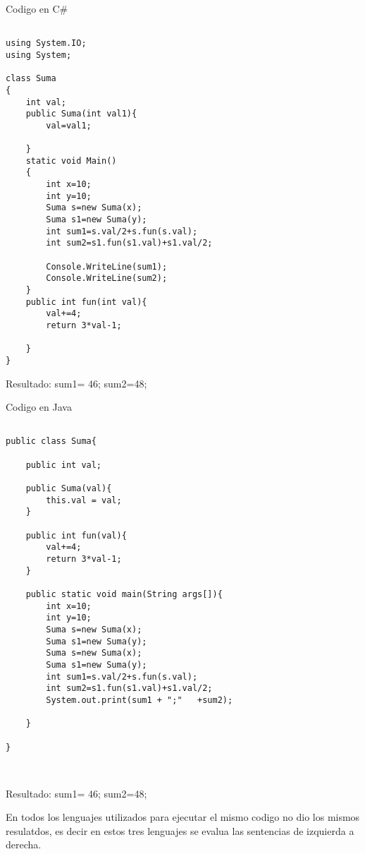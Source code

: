 \documentclass[11pt]{article}
\begin{document}
Codigo en C\#
\begin{lstlisting}[frame=single]  % Start your code-block

using System.IO;
using System;

class Suma
{
    int val;
    public Suma(int val1){
        val=val1;
        
    }
    static void Main()
    {
        int x=10;
        int y=10;
        Suma s=new Suma(x);
        Suma s1=new Suma(y);
        int sum1=s.val/2+s.fun(s.val);
        int sum2=s1.fun(s1.val)+s1.val/2;
        
        Console.WriteLine(sum1);
        Console.WriteLine(sum2);
    }
    public int fun(int val){
        val+=4;
        return 3*val-1;
        
    }
}

\end{lstlisting}
Resultado:
sum1= 46; sum2=48;
 


Codigo en Java
\begin{lstlisting}[frame=single]  % Start your code-block

public class Suma{

	public int val; 

	public Suma(val){
		this.val = val;
	}

	public int fun(val){
	 	val+=4;
        return 3*val-1;
	}
	
	public static void main(String args[]){
		int x=10;
		int y=10;
		Suma s=new Suma(x);
        Suma s1=new Suma(y);
        Suma s=new Suma(x);
        Suma s1=new Suma(y);
        int sum1=s.val/2+s.fun(s.val);
        int sum2=s1.fun(s1.val)+s1.val/2;        
        System.out.print(sum1 + ";"   +sum2);	
	
	}

}



\end{lstlisting}
Resultado:
sum1= 46; sum2=48;

En todos los lenguajes utilizados para ejecutar el mismo codigo no dio los mismos resulatdos, es decir en estos tres lenguajes se evalua las sentencias de izquierda a derecha. 
\end{document}
